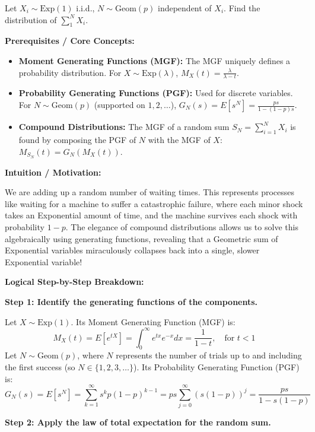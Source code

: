 \begin{exercise}\label{probability:2012:8}
Let $X_i \sim \mathrm{Exp}(1)$ i.i.d., $N \sim \mathrm{Geom}(p)$ independent of $X_i$. Find the distribution of $\sum_{1}^N X_i$.
\end{exercise}

\begin{solution}
\textbf{Prerequisites / Core Concepts:}
\begin{itemize}
    \item \textbf{Moment Generating Functions (MGF):} The MGF uniquely defines a probability distribution. For $X \sim \text{Exp}(\lambda)$, $M_X(t) = \frac{\lambda}{\lambda - t}$.
    \item \textbf{Probability Generating Functions (PGF):} Used for discrete variables. For $N \sim \text{Geom}(p)$ (supported on $1, 2, \dots$), $G_N(s) = E[s^N] = \frac{ps}{1 - (1-p)s}$.
    \item \textbf{Compound Distributions:} The MGF of a random sum $S_N = \sum_{i=1}^N X_i$ is found by composing the PGF of $N$ with the MGF of $X$: $M_{S_N}(t) = G_N(M_X(t))$.
\end{itemize}

\textbf{Intuition / Motivation:}

We are adding up a random number of waiting times. This represents processes like waiting for a machine to suffer a catastrophic failure, where each minor shock takes an Exponential amount of time, and the machine survives each shock with probability $1-p$. The elegance of compound distributions allows us to solve this algebraically using generating functions, revealing that a Geometric sum of Exponential variables miraculously collapses back into a single, slower Exponential variable!

\textbf{Logical Step-by-Step Breakdown:}

\textbf{Step 1: Identify the generating functions of the components.}

Let $X \sim \text{Exp}(1)$. Its Moment Generating Function (MGF) is:
\[ M_X(t) = E[e^{tX}] = \int_0^\infty e^{tx} e^{-x} dx = \frac{1}{1-t}, \quad \text{for } t < 1 \]
Let $N \sim \text{Geom}(p)$, where $N$ represents the number of trials up to and including the first success (so $N \in \{1, 2, 3, \dots\}$). Its Probability Generating Function (PGF) is:
\[ G_N(s) = E[s^N] = \sum_{k=1}^\infty s^k p (1-p)^{k-1} = p s \sum_{j=0}^\infty (s(1-p))^j = \frac{ps}{1 - s(1-p)} \]

\textbf{Step 2: Apply the law of total expectation for the random sum.}


\end{solution}
